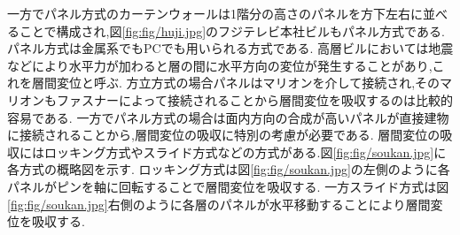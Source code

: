 一方でパネル方式のカーテンウォールは1階分の高さのパネルを方下左右に並べることで構成され,図\ref{fig:fig/huji.jpg}のフジテレビ本社ビルもパネル方式である.\cite{LIXIL70:online}
パネル方式は金属系でもPCでも用いられる方式である.
高層ビルにおいては地震などにより水平力が加わると層の間に水平方向の変位が発生することがあり,これを層間変位と呼ぶ.
方立方式の場合パネルはマリオンを介して接続され,そのマリオンもファスナーによって接続されることから層間変位を吸収するのは比較的容易である.
一方でパネル方式の場合は面内方向の合成が高いパネルが直接建物に接続されることから,層間変位の吸収に特別の考慮が必要である.
層間変位の吸収にはロッキング方式やスライド方式などの方式がある.図\ref{fig:fig/soukan.jpg}に各方式の概略図を示す.
ロッキング方式は図\ref{fig:fig/soukan.jpg}の左側のように各パネルがピンを軸に回転することで層間変位を吸収する.
一方スライド方式は図\ref{fig:fig/soukan.jpg}右側のように各層のパネルが水平移動することにより層間変位を吸収する.
